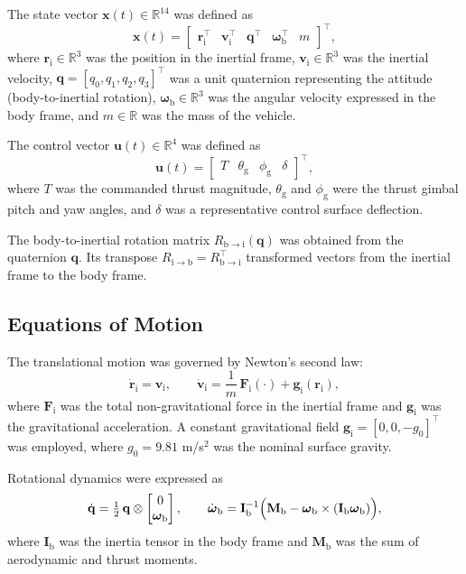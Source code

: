 The state vector \(\mathbf{x}(t) \in \mathbb{R}^{14}\) was defined as
\[
  \mathbf{x}(t) =
  \begin{bmatrix}
    \mathbf{r}_\mathrm{i}^\top &
    \mathbf{v}_\mathrm{i}^\top &
    \mathbf{q}^\top &
    \boldsymbol{\omega}_\mathrm{b}^\top &
    m
  \end{bmatrix}^\top ,
\]
where \(\mathbf{r}_\mathrm{i} \in \mathbb{R}^3\) was the position in the inertial
frame, \(\mathbf{v}_\mathrm{i} \in \mathbb{R}^3\) was the inertial velocity,
\(\mathbf{q} = [q_0, q_1, q_2, q_3]^\top\) was a unit quaternion representing the
attitude (body-to-inertial rotation), \(\boldsymbol{\omega}_\mathrm{b} \in
\mathbb{R}^3\) was the angular velocity expressed in the body frame, and \(m \in
\mathbb{R}\) was the mass of the vehicle.

The control vector \(\mathbf{u}(t) \in \mathbb{R}^4\) was defined as
\[
  \mathbf{u}(t) =
  \begin{bmatrix}
    T &
    \theta_\mathrm{g} &
    \phi_\mathrm{g} &
    \delta
  \end{bmatrix}^\top ,
\]
where \(T\) was the commanded thrust magnitude, \(\theta_\mathrm{g}\) and
\(\phi_\mathrm{g}\) were the thrust gimbal pitch and yaw angles, and \(\delta\) was a
representative control surface deflection.

The body-to-inertial rotation matrix
\(R_{\mathrm{b}\to\mathrm{i}}(\mathbf{q})\) was obtained from the quaternion
\(\mathbf{q}\). Its transpose \(R_{\mathrm{i}\to\mathrm{b}} =
R_{\mathrm{b}\to\mathrm{i}}^\top\) transformed vectors from the inertial frame to
the body frame.

\subsection{Equations of Motion}

The translational motion was governed by Newton's second law:
\[
  \dot{\mathbf{r}}_\mathrm{i} = \mathbf{v}_\mathrm{i}, \qquad
  \dot{\mathbf{v}}_\mathrm{i} =
  \frac{1}{m}\,\mathbf{F}_\mathrm{i}(\cdot) + \mathbf{g}_\mathrm{i}(\mathbf{r}_\mathrm{i}),
\]
where \(\mathbf{F}_\mathrm{i}\) was the total non-gravitational force in the
inertial frame and \(\mathbf{g}_\mathrm{i}\) was the gravitational acceleration.
A constant gravitational field \(\mathbf{g}_\mathrm{i} = [0, 0, -g_0]^\top\) was
employed, where \(g_0 = 9.81\) m/s\(^2\) was the nominal surface gravity.

Rotational dynamics were expressed as
\[
  \dot{\mathbf{q}} =
    \tfrac{1}{2}\,\mathbf{q} \otimes
    \begin{bmatrix}0 \\ \boldsymbol{\omega}_\mathrm{b}\end{bmatrix},
  \qquad
  \dot{\boldsymbol{\omega}}_\mathrm{b}
    = \mathbf{I}_\mathrm{b}^{-1}
      \Bigl(
        \mathbf{M}_\mathrm{b} -
        \boldsymbol{\omega}_\mathrm{b} \times
        (\mathbf{I}_\mathrm{b}\boldsymbol{\omega}_\mathrm{b})
      \Bigr),
\]
where \(\mathbf{I}_\mathrm{b}\) was the inertia tensor in the body frame and
\(\mathbf{M}_\mathrm{b}\) was the sum of aerodynamic and thrust moments.

